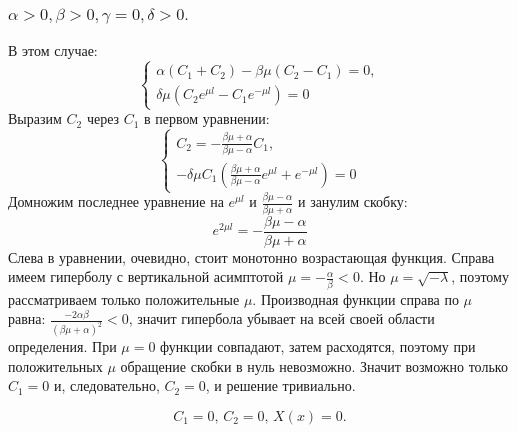 \documentclass[12pt, a4paper]{article}
\begin{document}
\subsubsection{ $ \alpha > 0, \beta > 0, \gamma = 0, \delta > 0. $}
В этом случае:
\begin{displaymath}
	\begin{cases}
		\alpha (C_{1} + C_{2}) - \beta \mu (C_{2} - C_{1}) = 0, \\
		\delta \mu (C_{2} e^{\mu l} - C_{1} e^{-\mu l}) = 0
	\end{cases}
\end{displaymath}
Выразим $C_{2}$ через $C_{1}$ в первом уравнении:
\begin{displaymath}
	\begin{cases}
		C_{2} = -\frac{\beta \mu + \alpha}{\beta \mu - \alpha} C_{1}, \\
		- \delta \mu C_{1} (\frac{\beta \mu + \alpha}{\beta \mu - \alpha} e^{\mu l} + e^{-\mu l}) = 0
	\end{cases}
\end{displaymath}
Домножим последнее уравнение на $e^{\mu l}$ и $\frac{\beta \mu - \alpha}{\beta \mu + \alpha}$ и занулим скобку:
\[ e^{2\mu l} = -\frac{\beta \mu - \alpha}{\beta \mu + \alpha} \]
Слева в уравнении, очевидно, стоит монотонно возрастающая функция. Справа имеем гиперболу с вертикальной асимптотой $\mu = -\frac{\alpha}{\beta} < 0$. Но $\mu = \sqrt{-\lambda}$, поэтому рассматриваем только положительные $\mu$. Производная функции справа по $\mu$ равна: $\frac{-2\alpha \beta}{(\beta \mu + \alpha)^2} < 0$, значит гипербола убывает на всей своей области определения. При $\mu = 0$ функции совпадают, затем расходятся, поэтому при положительных $\mu$ обращение скобки в нуль невозможно. Значит возможно только $C_{1} = 0$ и, следовательно, $C_{2} = 0$, и решение тривиально.

\[ C_{1} = 0, \, C_{2} = 0, \, X(x) = 0. \]
\end{document}
